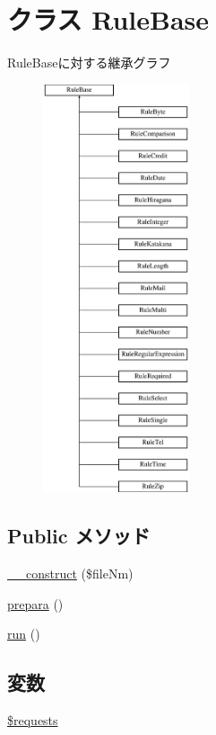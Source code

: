 \hypertarget{class_rule_base}{
\section{クラス \-Rule\-Base}
\label{class_rule_base}
}
\-Rule\-Baseに対する継承グラフ\begin{figure}[H]
\begin{center}
\leavevmode
\includegraphics[height=12.000000cm]{class_rule_base}
\end{center}
\end{figure}
\subsection*{\-Public メソッド}
\begin{DoxyCompactItemize}
\item 
\hyperlink{class_rule_base_a7fdd69956610727a5a36b4f020bcf115}{\-\_\-\-\_\-construct} (\$file\-Nm)
\item 
\hyperlink{class_rule_base_a70eef3a06fda47704282eda5ea2706d9}{prepara} ()
\item 
\hyperlink{class_rule_base_afb0fafe7e02a3ae1993c01c19fad2bae}{run} ()
\end{DoxyCompactItemize}
\subsection*{変数}
\begin{DoxyCompactItemize}
\item 
\hyperlink{class_rule_base_a28d7688bd020a3b104adc19d1e08df96}{\$requests}
\end{DoxyCompactItemize}
